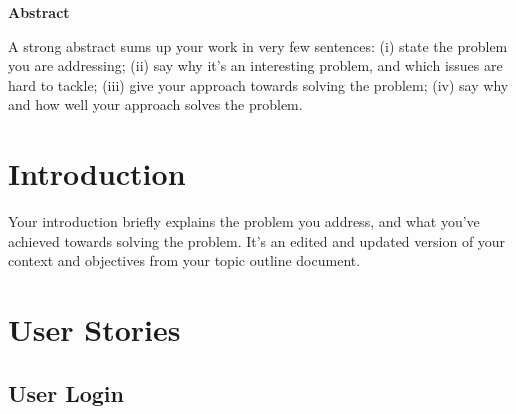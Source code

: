 \documentclass{scrartcl}
\renewenvironment{abstract}{
    \begin{center}
    {\Large \textbf{Abstract}}
    \vspace{0.5cm}
    \par\itshape
    \begin{minipage}{0.8\linewidth}}{\end{minipage}
    \noindent\ignorespaces
    \end{center}
}
\begin{document}
\begin{abstract}
  A strong abstract sums up your work in very few sentences:
  (i) state the problem you are addressing;
  (ii) say why it’s an interesting problem, and which issues are hard to tackle;
  (iii) give your approach towards solving the problem;
  (iv) say why and how well your approach solves the problem.
\end{abstract}\vspace{1cm}

\newpage

\tableofcontents

\newpage

\section{Introduction}

Your introduction briefly explains the problem you address, and what you've achieved towards solving the problem. It's an edited and updated version of your context and objectives from your topic outline document.

\section{User Stories}

\subsection{User Login}
\end{document}
